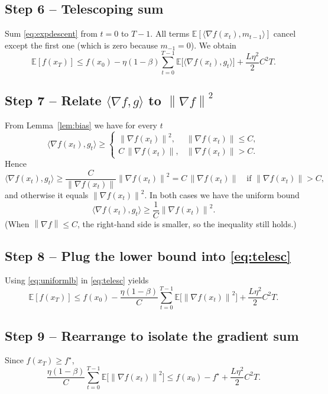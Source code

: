\documentclass{article}
\newcommand{\E}{\mathbb{E}}
\newcommand{\norm}[1]{\left\lVert#1\right\rVert}
\begin{document}
\subsection*{Step 6 – Telescoping sum}
Sum \eqref{eq:expdescent} from $t=0$ to $T-1$.
All terms $\E[\langle\nabla f(x_{t}),m_{t-1}\rangle]$ cancel except the first one (which is zero because $m_{-1}=0$).  We obtain
\[
\E[f(x_{T})]\le f(x_{0})
- \eta(1-\beta)\sum_{t=0}^{T-1}\E\!\bigl[\langle\nabla f(x_{t}),g_{t}\rangle\bigr]
+ \frac{L\eta^{2}}{2}C^{2}T.
\tag{5}\label{eq:telesc}
\]

\subsection*{Step 7 – Relate $\langle\nabla f,g\rangle$ to $\norm{\nabla f}^{2}$}
From Lemma~\ref{lem:bias} we have for every $t$
\[
\langle\nabla f(x_{t}),g_{t}\rangle \ge
\begin{cases}
\norm{\nabla f(x_{t})}^{2}, & \norm{\nabla f(x_{t})}\le C,\\[4pt]
C\,\norm{\nabla f(x_{t})}, & \norm{\nabla f(x_{t})}> C.
\end{cases}
\tag{6}\label{eq:lb}
\]
Hence
\[
\langle\nabla f(x_{t}),g_{t}\rangle
\ge \frac{C}{\norm{\nabla f(x_{t})}}\norm{\nabla f(x_{t})}^{2}
= C\,\norm{\nabla f(x_{t})}
\quad\text{if }\norm{\nabla f(x_{t})}>C,
\]
and otherwise it equals $\norm{\nabla f(x_{t})}^{2}$.  In both cases we have the uniform bound
\[
\langle\nabla f(x_{t}),g_{t}\rangle \ge \frac{1}{C}\norm{\nabla f(x_{t})}^{2}.
\tag{7}\label{eq:uniformlb}
\]
(When $\norm{\nabla f}\le C$, the right‑hand side is smaller, so the inequality still holds.)

\subsection*{Step 8 – Plug the lower bound into \eqref{eq:telesc}}
Using \eqref{eq:uniformlb} in \eqref{eq:telesc} yields
\[
\E[f(x_{T})]\le f(x_{0})
- \frac{\eta(1-\beta)}{C}\sum_{t=0}^{T-1}\E\!\bigl[\norm{\nabla f(x_{t})}^{2}\bigr]
+ \frac{L\eta^{2}}{2}C^{2}T.
\tag{8}\label{eq:prebound}
\]

\subsection*{Step 9 – Rearrange to isolate the gradient sum}
Since $f(x_{T})\ge f^{\star}$,
\[
\frac{\eta(1-\beta)}{C}\sum_{t=0}^{T-1}\E\!\bigl[\norm{\nabla f(x_{t})}^{2}\bigr]
\le f(x_{0})-f^{\star}+ \frac{L\eta^{2}}{2}C^{2}T.
\tag{9}\label{eq:gradsum}
\]
\end{document}
